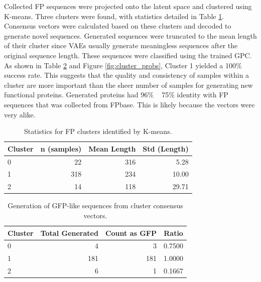 \documentclass[unnumsec,webpdf,contemporary,medium]{oup-authoring-template}
\begin{document}
Collected FP sequences were projected onto the latent space and clustered using K-means. Three clusters were found, with statistics detailed in Table \ref{tab:cluster_stats}. Consensus vectors were calculated based on these clusters and decoded to generate novel sequences. Generated sequences were truncated to the mean length of their cluster since VAEs usually generate meaningless sequences after the original sequence length. These sequences were classified using the trained GPC. As shown in Table \ref{tab:gfp_generation} and Figure \ref{fig:cluster_probs}, Cluster 1 yielded a 100\% success rate. This suggests that the quality and consistency of samples within a cluster are more important than the sheer number of samples for generating new functional proteins. Generated proteins had 96\% ~ 75\% identity with FP sequences that was collected from FPbase. This is likely because the vectors were very alike.

\begin{table}[!ht]
\caption{Statistics for FP clusters identified by K-means.}\label{tab:cluster_stats}
\centering
\begin{tabular}{@{}lrrr@{}}
\toprule
\textbf{Cluster} & \textbf{n (samples)} & \textbf{Mean Length} & \textbf{Std (Length)} \\
\midrule
0 & 22 & 316 & 5.28 \\
1 & 318 & 234 & 10.00 \\
2 & 14 & 118 & 29.71 \\
\bottomrule
\end{tabular}
\end{table}

\begin{table}[!ht]
\caption{Generation of GFP-like sequences from cluster consensus vectors.}\label{tab:gfp_generation}
\centering
\begin{tabular}{@{}lrrr@{}}
\toprule
\textbf{Cluster} & \textbf{Total Generated} & \textbf{Count as GFP} & \textbf{Ratio} \\
\midrule
0 & 4 & 3 & 0.7500 \\
1 & 181 & 181 & 1.0000 \\
2 & 6 & 1 & 0.1667 \\
\bottomrule
\end{tabular}
\end{table}
\end{document}
